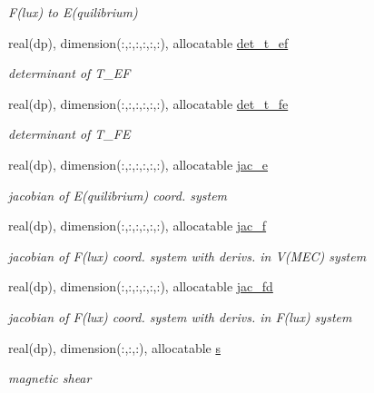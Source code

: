 \begin{DoxyCompactItemize}
\begin{DoxyCompactList}\small\item\em F(lux) to E(quilibrium) \end{DoxyCompactList}\item 
real(dp), dimension(\+:,\+:,\+:,\+:,\+:,\+:), allocatable \hyperlink{structeq__vars_1_1eq__2__type_ab40bc793e216edfa2097fdd6378d1e76}{det\+\_\+t\+\_\+ef}
\begin{DoxyCompactList}\small\item\em determinant of T\+\_\+\+EF \end{DoxyCompactList}\item 
real(dp), dimension(\+:,\+:,\+:,\+:,\+:,\+:), allocatable \hyperlink{structeq__vars_1_1eq__2__type_a96e1497e388a30e0bb418c1bfb865f45}{det\+\_\+t\+\_\+fe}
\begin{DoxyCompactList}\small\item\em determinant of T\+\_\+\+FE \end{DoxyCompactList}\item 
real(dp), dimension(\+:,\+:,\+:,\+:,\+:,\+:), allocatable \hyperlink{structeq__vars_1_1eq__2__type_a5f712048cde053a9d2bcbf94ef2ce7ee}{jac\+\_\+e}
\begin{DoxyCompactList}\small\item\em jacobian of E(quilibrium) coord. system \end{DoxyCompactList}\item 
real(dp), dimension(\+:,\+:,\+:,\+:,\+:,\+:), allocatable \hyperlink{structeq__vars_1_1eq__2__type_a24c4f457690f1a873d501b6f6fc6c697}{jac\+\_\+f}
\begin{DoxyCompactList}\small\item\em jacobian of F(lux) coord. system with derivs. in V(\+M\+E\+C) system \end{DoxyCompactList}\item 
real(dp), dimension(\+:,\+:,\+:,\+:,\+:,\+:), allocatable \hyperlink{structeq__vars_1_1eq__2__type_a17d09b18196fe427feaa96d691146e01}{jac\+\_\+fd}
\begin{DoxyCompactList}\small\item\em jacobian of F(lux) coord. system with derivs. in F(lux) system \end{DoxyCompactList}\item 
real(dp), dimension(\+:,\+:,\+:), allocatable \hyperlink{structeq__vars_1_1eq__2__type_a5b7cfba01aa6c28646bf47d5f28c25c0}{s}
\begin{DoxyCompactList}\small\item\em magnetic shear \end{DoxyCompactList}\item 

\end{DoxyCompactItemize}
